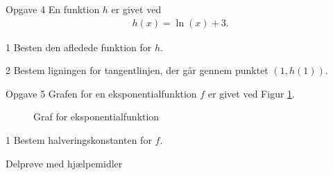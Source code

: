 \newpage

\begin{opgavetekst}{Opgave 4}
	En funktion $h$ er givet ved
	\begin{align*}
		h(x) = \ln(x) + 3.
	\end{align*}
\end{opgavetekst}

\begin{delopgave}{}{1}
	Besten den afledede funktion for $h$. 
\end{delopgave}
\begin{delopgave}{}{2}
	Bestem ligningen for tangentlinjen, der går gennem punktet $(1,h(1))$.
\end{delopgave}

\begin{opgavetekst}{Opgave 5}
	Grafen for en eksponentialfunktion $f$ er givet ved Figur \ref{fig:eksp}.
	\begin{figure}[H]
		\centering
		\caption{Graf for eksponentialfunktion}
		\label{fig:eksp}
	\end{figure}
	\phantom{h}
\end{opgavetekst}
\begin{delopgave}{}{1}
	Bestem halveringskonstanten for $f$. 
\end{delopgave}


\newpage

\begin{center}
\LARGE
Delprøve med hjælpemidler 
\end{center}

